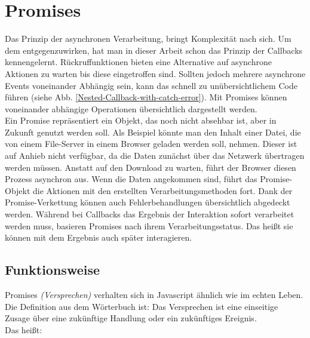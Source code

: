 \section{Promises}

Das Prinzip der asynchronen Verarbeitung, bringt Komplexität nach sich. Um dem entgegenzuwirken, hat man in dieser Arbeit schon das Prinzip der Callbacks kennengelernt. Rückruffunktionen bieten eine Alternative auf asynchrone Aktionen zu warten bis diese eingetroffen sind. Sollten jedoch mehrere asynchrone Events voneinander Abhängig sein, kann das schnell zu unübersichtlichem Code führen (siehe Abb. \ref{Nested-Callback-with-catch-error}). Mit Promises können voneinander abhängige Operationen übersichtlich dargestellt werden.\\

\noindent
Ein Promise repräsentiert ein Objekt, das noch nicht absehbar ist, aber in Zukunft genutzt werden soll. Als Beispiel könnte man den Inhalt einer Datei, die von einem File-Server in einem Browser geladen werden soll, nehmen. Dieser ist auf Anhieb nicht verfügbar, da die Daten zunächst über das Netzwerk übertragen werden müssen. Anstatt auf den Download zu warten, führt der Browser diesen Prozess asynchron aus. Wenn die Daten angekommen sind, führt das Promise-Objekt die Aktionen mit den erstellten Verarbeitungsmethoden fort. Dank der Promise-Verkettung können auch Fehlerbehandlungen übersichtlich abgedeckt werden. Während bei Callbacks das Ergebnis der Interaktion sofort verarbeitet werden muss, basieren Promises nach ihrem Verarbeitungsstatus. Das heißt sie können mit dem Ergebnis auch \glqq{}später\grqq{} interagieren.

\subsection{Funktionsweise}

\noindent
Promises \textit{(Versprechen)} verhalten sich in Javascript ähnlich wie im echten Leben. Die Definition aus dem Wörterbuch ist: Das Versprechen ist eine einseitige Zusage über eine zukünftige Handlung oder ein zukünftiges Ereignis\cite{versprechen}.\\

\noindent
Das heißt:

